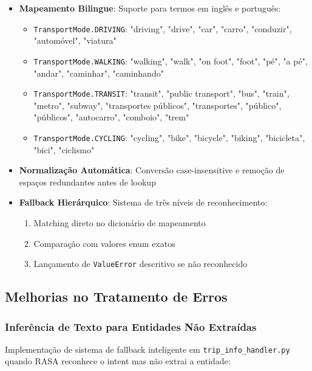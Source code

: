 \documentclass{report}
\begin{document}
\begin{itemize}
    \item \textbf{Mapeamento Bilingue}: Suporte para termos em inglês e português:
    \begin{itemize}
        \item \texttt{TransportMode.DRIVING}: "driving", "drive", "car", "carro", "conduzir", "automóvel", "viatura"
        \item \texttt{TransportMode.WALKING}: "walking", "walk", "on foot", "foot", "pé", "a pé", "andar", "caminhar", "caminhando"
        \item \texttt{TransportMode.TRANSIT}: "transit", "public transport", "bus", "train", "metro", "subway", "transportes públicos", "transportes", "público", "públicos", "autocarro", "comboio", "trem"
        \item \texttt{TransportMode.CYCLING}: "cycling", "bike", "bicycle", "biking", "bicicleta", "bici", "ciclismo"
    \end{itemize}
    
    \item \textbf{Normalização Automática}: Conversão case-insensitive e remoção de espaços redundantes antes de lookup
    
    \item \textbf{Fallback Hierárquico}: Sistema de três níveis de reconhecimento:
    \begin{enumerate}
        \item Matching direto no dicionário de mapeamento
        \item Comparação com valores enum exatos
        \item Lançamento de \texttt{ValueError} descritivo se não reconhecido
    \end{enumerate}
\end{itemize}

\subsection{Melhorias no Tratamento de Erros}

\subsubsection{Inferência de Texto para Entidades Não Extraídas}

Implementação de sistema de fallback inteligente em \texttt{trip\_info\_handler.py} quando RASA reconhece o intent mas não extrai a entidade:
\end{document}
